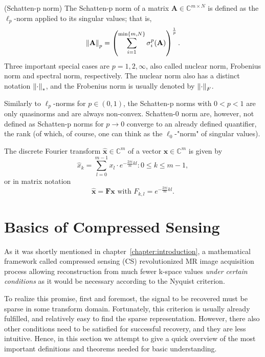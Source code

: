 \begin{tight_equations}
\begin{definition}(Schatten-p norm)
The Schatten-p norm of a matrix $\mathbf{A} \in \mathbb{C}^{m \times N}$ is defined as the $\ell_p$-norm applied to its singular values; that is,
\[\left\lVert\mathbf{A}\right\rVert_p = \left(\sum_{i=1}^{\min\{m,N\}}\sigma_i^p(\mathbf{A})\right)^\frac{1}{p}.\]
Three important special cases are $p = 1, 2, \infty$, also called nuclear norm, Frobenius norm and spectral norm, respectively. The nuclear norm also has a distinct notation $\left\lVert\cdot\right\rVert_*$, and the Frobenius norm is usually denoted by $\left\lVert\cdot\right\rVert_F$.
\end{definition}

\begin{remark}
Similarly to $\ell_p$-norms for $p \in (0,1)$, the Schatten-p norms with $0 < p < 1$ are only quasinorms and are always non-convex. Schatten-0 norm are, however, not defined as Schatten-p norms for $p \rightarrow 0$ converge to an already defined quantifier, the rank (of which, of course, one can think as the $\ell_0$-"norm" of singular values).
\end{remark}

\begin{definition}
The discrete Fourier transform $\mathbf{\hat{x}} \in \mathbb{C}^m$ of a vector $\mathbf{x} \in \mathbb{C}^m$ is given by
\[\hat{x}_k = \sum_{l = 0}^{m-1} x_l \cdot e^{-\frac{2\pi i}{m}kl} : 0 \le k \le m-1,\]
or in matrix notation
\[\mathbf{\hat{x}} = \mathbf{Fx} \text{ with } F_{k,l} = e^{-\frac{2\pi i}{m}kl}.\]
\end{definition}

\end{tight_equations}

\section{Basics of Compressed Sensing}
As it was shortly mentioned in chapter~\ref{chapter:introduction}, a mathematical framework called compressed sensing (CS) revolutionized MR image acquisition process allowing reconstruction from much fewer k-space values \textit{under certain conditions} as it would be necessary according to the Nyquist criterion.

To realize this promise, first and foremost, the signal to be recovered must be sparse in some transform domain.
Fortunately, this criterion is usually already fulfilled, and relatively easy to find the sparse representation. However, there also other conditions need to be satisfied for successful recovery, and they are less intuitive. Hence, in this section we attempt to give a quick overview of the most important definitions and theorems needed for basic understanding.

